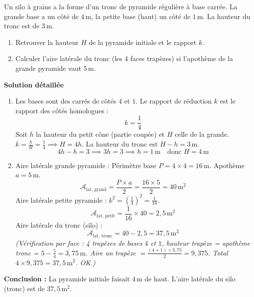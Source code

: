 \documentclass[11pt]{article}
\begin{document}
\begin{exoresolu}
    Un silo à grains a la forme d'un tronc de pyramide régulière à base carrée. La grande base a un côté de $4\,\text{m}$, la petite base (haut) un côté de $1\,\text{m}$. La hauteur du tronc est de $3\,\text{m}$.
    \begin{enumerate}
        \item Retrouver la hauteur $H$ de la pyramide initiale et le rapport $k$.
        \item Calculer l'aire latérale du tronc (les 4 faces trapèzes) si l'apothème de la grande pyramide vaut $5\,\text{m}$.
    \end{enumerate}
    \tcblower
    \textbf{Solution détaillée}
    \begin{enumerate}
        \item Les bases sont des carrés de côtés $4$ et $1$. Le rapport de réduction $k$ est le rapport des côtés homologues :
            \[ k = \frac{1}{4} \]
            Soit $h$ la hauteur du petit cône (partie coupée) et $H$ celle de la grande. $k = \frac{h}{H} = \frac{1}{4} \implies H = 4h$.
            La hauteur du tronc est $H - h = 3\,\text{m}$.
            \[ 4h - h = 3 \implies 3h = 3 \implies h = 1\,\text{m} \quad \text{donc } H = 4\,\text{m} \]
        \item Aire latérale grande pyramide : Périmètre base $P = 4 \times 4 = 16\,\text{m}$. Apothème $a = 5\,\text{m}$.
            \[ \mathcal{A}_{\text{lat, grand}} = \frac{P \times a}{2} = \frac{16 \times 5}{2} = 40\,\text{m}^2 \]
            Aire latérale petite pyramide : $k^2 = \left(\frac{1}{4}\right)^2 = \frac{1}{16}$.
            \[ \mathcal{A}_{\text{lat, petit}} = \frac{1}{16} \times 40 = 2,5\,\text{m}^2 \]
            Aire latérale du tronc (silo) :
            \[ \mathcal{A}_{\text{lat, tronc}} = 40 - 2,5 = 37,5\,\text{m}^2 \]
            \emph{(Vérification par face : 4 trapèzes de bases $4$ et $1$, hauteur trapèze = apothème tronc = $5 - \frac{5}{4} = 3,75\,\text{m}$. Aire un trapèze $= \frac{(4+1)\times 3,75}{2} = 9,375$. Total $4 \times 9,375 = 37,5\,\text{m}^2$. OK.)}
    \end{enumerate}
    \textbf{Conclusion :} La pyramide initiale faisait $4\,\text{m}$ de haut. L'aire latérale du silo (tronc) est de $37,5\,\text{m}^2$.
\end{exoresolu}
\end{document}
